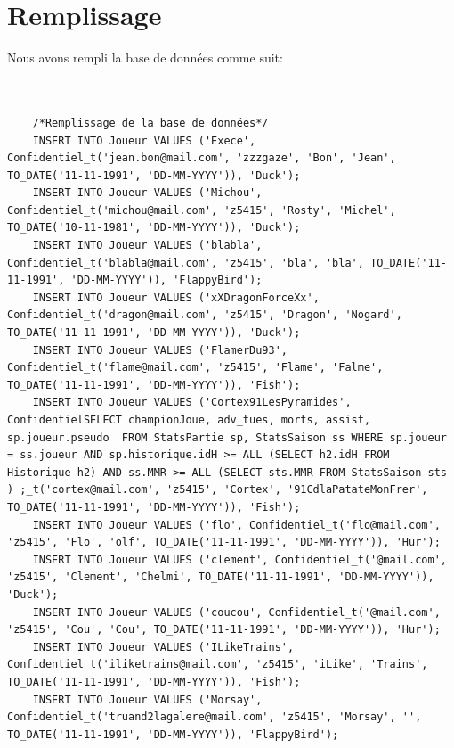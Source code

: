 \documentclass[a4paper,10pt]{report}
\begin{document}
\section{Remplissage}
Nous avons rempli la base de données comme suit:
\begin{lstlisting}


    /*Remplissage de la base de données*/
    INSERT INTO Joueur VALUES ('Exece', Confidentiel_t('jean.bon@mail.com', 'zzzgaze', 'Bon', 'Jean', TO_DATE('11-11-1991', 'DD-MM-YYYY')), 'Duck');
    INSERT INTO Joueur VALUES ('Michou', Confidentiel_t('michou@mail.com', 'z5415', 'Rosty', 'Michel', TO_DATE('10-11-1981', 'DD-MM-YYYY')), 'Duck');
    INSERT INTO Joueur VALUES ('blabla', Confidentiel_t('blabla@mail.com', 'z5415', 'bla', 'bla', TO_DATE('11-11-1991', 'DD-MM-YYYY')), 'FlappyBird');
    INSERT INTO Joueur VALUES ('xXDragonForceXx', Confidentiel_t('dragon@mail.com', 'z5415', 'Dragon', 'Nogard', TO_DATE('11-11-1991', 'DD-MM-YYYY')), 'Duck');
    INSERT INTO Joueur VALUES ('FlamerDu93', Confidentiel_t('flame@mail.com', 'z5415', 'Flame', 'Falme', TO_DATE('11-11-1991', 'DD-MM-YYYY')), 'Fish');
    INSERT INTO Joueur VALUES ('Cortex91LesPyramides', ConfidentielSELECT championJoue, adv_tues, morts, assist, sp.joueur.pseudo  FROM StatsPartie sp, StatsSaison ss WHERE sp.joueur = ss.joueur AND sp.historique.idH >= ALL (SELECT h2.idH FROM Historique h2) AND ss.MMR >= ALL (SELECT sts.MMR FROM StatsSaison sts ) ;_t('cortex@mail.com', 'z5415', 'Cortex', '91CdlaPatateMonFrer', TO_DATE('11-11-1991', 'DD-MM-YYYY')), 'Fish');
    INSERT INTO Joueur VALUES ('flo', Confidentiel_t('flo@mail.com', 'z5415', 'Flo', 'olf', TO_DATE('11-11-1991', 'DD-MM-YYYY')), 'Hur');
    INSERT INTO Joueur VALUES ('clement', Confidentiel_t('@mail.com', 'z5415', 'Clement', 'Chelmi', TO_DATE('11-11-1991', 'DD-MM-YYYY')), 'Duck');
    INSERT INTO Joueur VALUES ('coucou', Confidentiel_t('@mail.com', 'z5415', 'Cou', 'Cou', TO_DATE('11-11-1991', 'DD-MM-YYYY')), 'Hur');
    INSERT INTO Joueur VALUES ('ILikeTrains', Confidentiel_t('iliketrains@mail.com', 'z5415', 'iLike', 'Trains', TO_DATE('11-11-1991', 'DD-MM-YYYY')), 'Fish');
    INSERT INTO Joueur VALUES ('Morsay', Confidentiel_t('truand2lagalere@mail.com', 'z5415', 'Morsay', '', TO_DATE('11-11-1991', 'DD-MM-YYYY')), 'FlappyBird');


\end{lstlisting}
\end{document}
